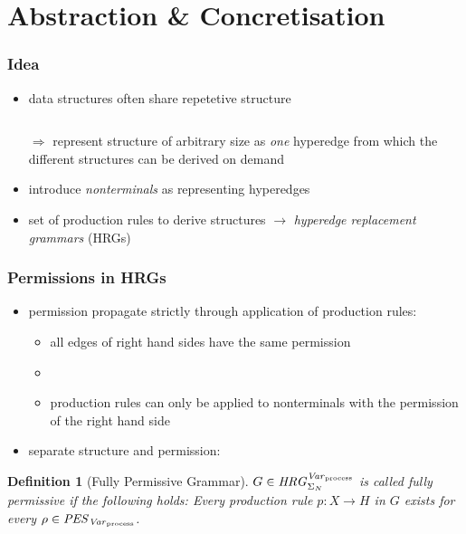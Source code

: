 \documentclass{beamer}
\newtheorem{defi}{Definition}
\renewenvironment{definition}
	{\begin{mdframed}[nobreak=true]\begin{defi}}
	{\end{defi}\end{mdframed}}
\begin{document}
\section{Abstraction \& Concretisation}
\begin{frame}
	\frametitle{Idea}
	\begin{itemize}
		\item data structures often share repetetive structure
	\end{itemize}
	\begin{columns}
				\resizebox{\textwidth}{!}{}
				\resizebox{\textwidth}{!}{}
				\resizebox{\textwidth}{!}{}
	\end{columns}
	\begin{itemize}
		\item[$\Rightarrow$] represent structure of arbitrary size as \emph{one}
			hyperedge from which the different structures can be derived on demand
		\item introduce \emph{nonterminals} as representing hyperedges
		\item set of production rules to derive structures $\rightarrow$
			\emph{hyperedge replacement grammars} (HRGs)
	\end{itemize}
\end{frame}

\begin{frame}
	\frametitle{Permissions in HRGs}
	\begin{itemize}
		\item permission propagate strictly through application of production rules:
			\begin{itemize}
				\item all edges of right hand sides have the same permission
				\item \parbox{4cm}{\resizebox{4cm}{!}{}}
				\item production rules can only be applied to nonterminals with the
					permission of the right hand side
			\end{itemize}
		\item separate structure and permission:
	\end{itemize}
	\begin{definition}[Fully Permissive Grammar]
		$G\in\mathit{HRG}_{\Sigma_{N}}^{\mathit{Var}_{\text{process}}}$ is called \emph{fully permissive} if the following holds:
		Every production rule $p\colon X\rightarrow H$ in $G$ exists for every
		$\rho\in\mathit{PES}_{\mathit{Var}_{\text{process}}}$.
	\end{definition}
\end{frame}
\end{document}
